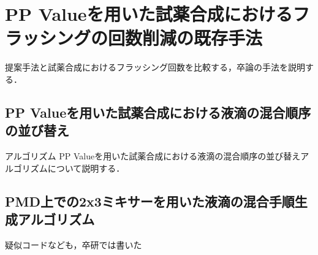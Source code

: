 \chapter{PP Valueを用いた試薬合成におけるフラッシングの回数削減の既存手法}
提案手法と試薬合成におけるフラッシング回数を比較する，卒論の手法を説明する．
\section{PP Valueを用いた試薬合成における液滴の混合順序の並び替え}アルゴリズム
PP Valueを用いた試薬合成における液滴の混合順序の並び替えアルゴリズムについて説明する．
\section{PMD上での2x3ミキサーを用いた液滴の混合手順生成アルゴリズム}
疑似コードなども，卒研では書いた

